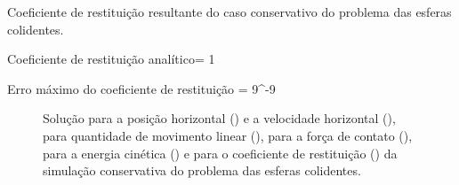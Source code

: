 \begin{table}[H]
\centering
\caption{Coeficiente de restituição resultante do caso conservativo do problema das esferas colidentes.}
\label{tab:colliding_spheres:conservative:energy_and_coefficient_of_restitution}
\begin{parametersdesc}{0.8\textwidth}
	\item{Coeficiente de restituição analítico}{\coefficientOfRestitution = 1}{}
	\item{Erro máximo do coeficiente de restituição}{\maximumErrorOf{\coefficientOfRestitution} = 9^{-9}}{}
\end{parametersdesc}
\sourceMe 
\end{table}

\begin{figure}[H]
	\caption[Solução para a posição horizontal e a velocidade horizontal, para quantidade de movimento linear, para a força de contato, para a energia cinética e para o coeficiente de restituição da simulação conservativa do problema das esferas colidentes.]{Solução para a posição horizontal () e a velocidade horizontal (), para quantidade de movimento linear (), para a força de contato (), para a energia cinética () e para o coeficiente de restituição () da simulação conservativa do problema das esferas colidentes.}
	\centering
	\captionsetup[subfloat]{labelfont=bf}
\end{figure}
